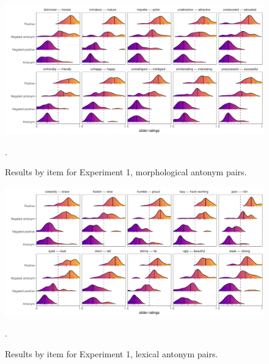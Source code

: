 \documentclass[floatsintext,doc]{apa6}
\begin{document}


\begin{figure}[t]
\centering \includegraphics{figs/cogsci_expt1_morph_byItem_densities.pdf} 
\caption{Results by item for Experiment 1, morphological antonym pairs.}.\label{fig:items_morph_expt1}
\end{figure}



\begin{figure}[t]
\centering \includegraphics{figs/cogsci_expt1_lex_byItem_densities.pdf} 
\caption{Results by item for Experiment 1, lexical antonym pairs.}.\label{fig:items_lex_expt1}

\end{figure}




\end{document}
